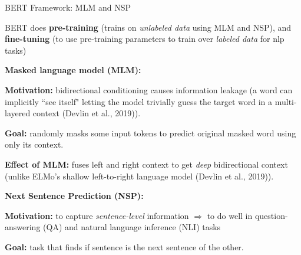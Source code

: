 \begin{frame}{BERT Framework: MLM and NSP}

\linespread{0.3} 

BERT does \textbf{pre-training} (trains on \emph{unlabeled data} using MLM and NSP), and \textbf{fine-tuning} (to use pre-training parameters to train over \emph{labeled data} for nlp tasks)


{\small \textbf{Masked language model (MLM): }}
    \begin{itemizeSpaced}{5pt}
        \pinkbox \textbf{Motivation: } bidirectional conditioning causes information leakage (a word can implicitly ``see itself" letting the model trivially guess the target word in a multi-layered context (Devlin et al., 2019)). 
        
        \item \textbf{Goal: }randomly masks some input tokens to predict original masked word using only its context. 
        
        \item \textbf{Effect of MLM: } fuses left and right context to get \emph{deep} bidirectional context (unlike ELMo's shallow left-to-right language model (Devlin et al., 2019)).  
    \end{itemizeSpaced}
    
{\small \textbf{Next Sentence Prediction (NSP):}}
    \begin{itemizeSpaced}{5pt}
        \pinkbox \textbf{Motivation: } to capture \emph{sentence-level} information $\Rightarrow$ to do well in question-answering (QA) and natural language inference (NLI) tasks
        
        
        \item \textbf{Goal: } task that finds if sentence is the next sentence of the other. 
        
    \end{itemizeSpaced}
    
\end{frame}


